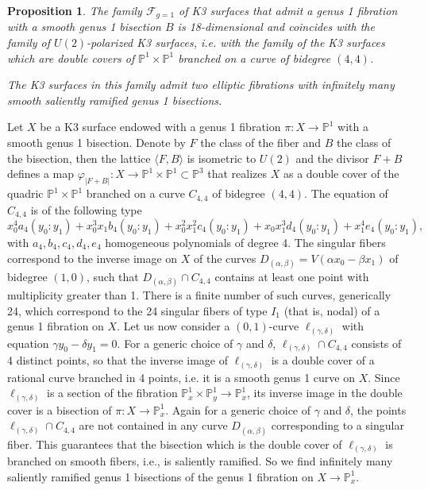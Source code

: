 \documentclass{amsart}
\newtheorem{proposition}[theorem]{Proposition}
\theoremstyle{definition}
\numberwithin{equation}{section}
\newcommand{\ra}{\rightarrow}
\begin{document}
\begin{proposition}\label{prop: F g=1 smooth bisection}
The family $\mathcal{F}_{g=1}$ of K3 surfaces that admit a genus 1 fibration with a smooth genus 1 bisection $B$ is 18-dimensional and coincides with the family of $U(2)$-polarized K3 surfaces, i.e. with
the family of the K3 surfaces which are double covers of $\mathbb{P}^1\times \mathbb{P}^1$ branched on a curve of bidegree $(4,4)$.

The K3 surfaces in this family admit two elliptic fibrations with infinitely many smooth saliently ramified genus 1 bisections. 
\end{proposition}
\proof
Let $X$ be a K3 surface endowed with a genus 1 fibration $\pi:X\ra \mathbb{P}^1$ with a smooth genus 1 bisection. Denote by $F$ the class of the fiber and $B$ the class of the bisection, then the lattice $\langle F, B\rangle$ is isometric to $U(2)$ and the divisor $F+B$ defines a map $\varphi_{|F+B|}:X\ra\mathbb{P}^1\times \mathbb{P}^1\subset \mathbb{P}^3$ that realizes $X$ as a double cover of the quadric $\mathbb{P}^1\times \mathbb{P}^1$ branched on a curve $C_{4,4}$ of bidegree $(4,4)$.
The equation of $C_{4,4}$ is of the following type 
$$x_0^4a_4(y_0:y_1)+x_0^3x_1b_4(y_0:y_1)+x_0^2x_1^2c_4(y_0:y_1)+x_0x_1^3d_4(y_0:y_1)+x_1^4e_4(y_0:y_1),$$ with $a_4,b_4,c_4,d_4,e_4$ homogeneous polynomials of degree 4.
The singular fibers correspond to the inverse image on $X$ of the curves $D_{(\alpha,\beta)}=V(\alpha x_0-\beta x_1)$ of bidegree $(1,0)$,  such that $D_{(\alpha,\beta)}\cap C_{4,4}$ contains at least one point with multiplicity greater than 1. There is a finite number of such curves, generically 24, which correspond to the 24 singular fibers of type $I_1$ (that is, nodal) of a genus 1 fibration on $X$. Let us now consider a $(0,1)$-curve $\ell_{(\gamma,\delta)}$ with equation $\gamma y_0-\delta y_1=0$. For a generic choice of $\gamma$ and $\delta$, $\ell_{(\gamma,\delta)}\cap C_{4,4}$ consists of 4 distinct points, so that the inverse image of $\ell_{(\gamma,\delta)}$ is a double cover of a rational curve branched in 4 points, i.e. it is a smooth genus 1 curve on $X$. Since $\ell_{(\gamma,\delta)}$ is a section of the fibration $\mathbb{P}^1_x\times \mathbb{P}^1_y\ra\mathbb{P}^1_x$, its inverse image in the double cover is a bisection of $\pi:X\ra\mathbb{P}^1_x$.  
Again for a generic choice of  $\gamma$ and $\delta$, the points $\ell_{(\gamma,\delta)}\cap C_{4,4}$ are not contained in any curve $D_{(\alpha, \beta)}$ corresponding to a singular fiber. This guarantees that the bisection which is the double cover of $\ell_{(\gamma,\delta)}$ is branched on smooth fibers, i.e., is saliently ramified. So we find infinitely many saliently ramified genus 1 bisections of the genus 1 fibration on $X\ra\mathbb{P}^1_x$.\endproof
\end{document}
